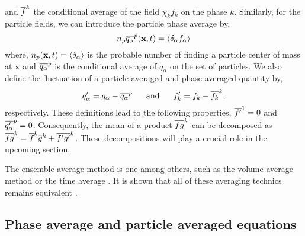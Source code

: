 and $\overline{f}^k$ the conditional average of the field $\chi_k f_k$ on the phase $k$.
Similarly, for the particle fields, we can introduce the particle phase average by,
\begin{equation}
     n_p\overline{q_\alpha}^{p}(\textbf{x},t) = \left<\delta_\alpha f_\alpha\right>
     \label{eq:p_avg}
\end{equation}
where, $n_p(\textbf{x},t) = \left<\delta_\alpha\right>$ is the probable number of finding a particle center of mass at $\textbf{x}$
and $\overline{q_\alpha}^{p}$ is the conditional average of $q_\alpha$ on the set of particles. 
We also define the fluctuation of a particle-averaged and phase-averaged quantity by,
\begin{equation}
    q_\alpha' = q_\alpha - \overline{q_\alpha}^{p}
    \;\;\;\;\;\;\text{and}
    \;\;\;\;\;\;
    f_k' = f_k - \overline{f_k}^k,
    \label{eq:def_fluctu}
\end{equation}
respectively. 
These definitions lead to the following properties, $\overline{f'}^1 = 0$ and $\overline{q_\alpha'}^{p} =0$. 
Consequently, the mean of a product $\overline{fg}^k$ can be decomposed as $\overline{fg}^k=\overline{f}^k\overline{g}^k + \overline{f'g'}^k$. 
These decompositions will play a crucial role in the upcoming section. 

The ensemble average method is one among others, such as the volume average method\citep{jackson1997locally} or the time average
\citep{ishii2010thermo}.
It is shown that all of these averaging technics remains equivalent \citep{jackson1997locally}. 

\subsection{Phase average and particle averaged equations}

